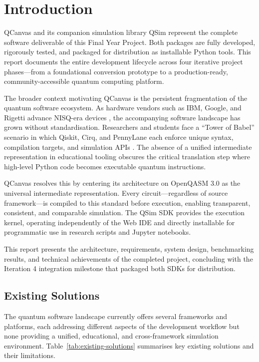 \chapter{Introduction}
\label{ch:introduction}

QCanvas and its companion simulation library QSim represent the complete software deliverable of this Final Year Project. Both packages are fully developed, rigorously tested, and packaged for distribution as installable Python tools. This report documents the entire development lifecycle across four iterative project phases---from a foundational conversion prototype to a production-ready, community-accessible quantum computing platform.

The broader context motivating QCanvas is the persistent fragmentation of the quantum software ecosystem. As hardware vendors such as IBM, Google, and Rigetti advance NISQ-era devices \cite{preskill2018quantum}, the accompanying software landscape has grown without standardisation. Researchers and students face a ``Tower of Babel'' scenario in which Qiskit, Cirq, and PennyLane each enforce unique syntax, compilation targets, and simulation APIs \cite{qiskit, cirq_developers_2023, bergholm2018pennylane}. The absence of a unified intermediate representation in educational tooling obscures the critical translation step where high-level Python code becomes executable quantum instructions.

QCanvas resolves this by centering its architecture on OpenQASM 3.0 \cite{cross2021openqasm} as the universal intermediate representation. Every circuit---regardless of source framework---is compiled to this standard before execution, enabling transparent, consistent, and comparable simulation. The QSim SDK \cite{qsim_sdk_2026} provides the execution kernel, operating independently of the Web IDE and directly installable for programmatic use in research scripts and Jupyter notebooks.

This report presents the architecture, requirements, system design, benchmarking results, and technical achievements of the completed project, concluding with the Iteration 4 integration milestone that packaged both SDKs for distribution.

\section{Existing Solutions}

The quantum software landscape currently offers several frameworks and platforms, each addressing different aspects of the development workflow but none providing a unified, educational, and cross-framework simulation environment. Table~\ref{tab:existing-solutions} summarises key existing solutions and their limitations.

